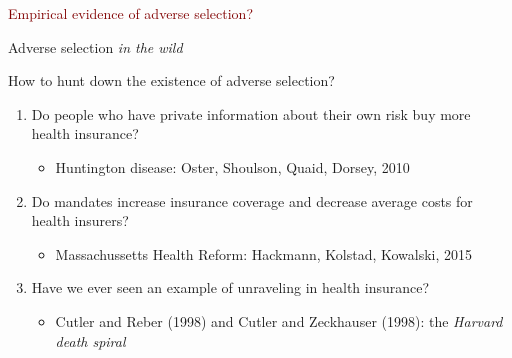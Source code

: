 \begin{frame}{}

    \begin{center}
        \Large \textcolor{maroon}{Empirical evidence of adverse selection?}\\
        \vspace{15mm}
        \normalsize

    \end{center}

\end{frame}
\begin{frame}{Adverse selection \textit{in the wild}}

    How to hunt down the existence of adverse selection?
    \begin{enumerate}
        \item Do people who have private information about their own risk buy more health insurance?
        \begin{itemize}
            \item Huntington disease: Oster, Shoulson, Quaid, Dorsey, 2010
        \end{itemize}
        \vspace{2mm}
        
        \item Do mandates increase insurance coverage and decrease average costs for health insurers?
        \begin{itemize}
            \item Massachussetts Health Reform: Hackmann, Kolstad, Kowalski, 2015
        \end{itemize}
        \vspace{2mm}

        \item Have we ever seen an example of unraveling in health insurance?
        \begin{itemize}
            \item Cutler and Reber (1998) and Cutler and Zeckhauser (1998): the \textit{Harvard death spiral}
        \end{itemize}
    \end{enumerate}

\end{frame}
